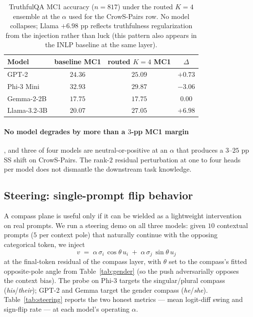 \begin{table}[h]
\centering
\small
\caption{TruthfulQA MC1 accuracy ($n=817$) under the routed $K{=}4$
ensemble at the $\alpha$ used for the CrowS-Pairs row. No model
collapses; Llama $+6.98$ pp reflects truthfulness regularization from
the injection rather than luck (this pattern also appears in the
INLP baseline at the same layer).}
\label{tab:truthfulqa}
\begin{tabular}{lccc}
\toprule
Model & baseline MC1 & routed $K{=}4$ MC1 & $\Delta$ \\
\midrule
GPT-2        & $24.36$ & $25.09$ & $+0.73$ \\
Phi-3 Mini   & $32.93$ & $29.87$ & $-3.06$ \\
Gemma-2-2B   & $17.75$ & $17.75$ & $0.00$  \\
Llama-3.2-3B & $20.07$ & $27.05$ & $+6.98$ \\
\bottomrule
\end{tabular}
\end{table}

\paragraph{No model degrades by more than a $3$-pp MC1 margin}, and
three of four models are neutral-or-positive at an $\alpha$ that
produces a $3$--$25$ pp SS shift on CrowS-Pairs. The rank-$2$ residual
perturbation at one to four heads per model does not dismantle the
downstream task knowledge.

\subsection{Steering: single-prompt flip behavior}
\label{sec:steering}

A compass plane is useful only if it can be wielded as a lightweight
intervention on real prompts. We run a steering demo on all three
models: given $10$ contextual prompts ($5$ per context pole) that
naturally continue with the opposing categorical token, we inject
\[
v \;=\; \alpha\,\sigma_i\,\cos\theta\,u_i \;+\; \alpha\,\sigma_j\,\sin\theta\,u_j
\]
at the final-token residual of the compass layer, with $\theta$ set to
the compass's fitted opposite-pole angle from Table~\ref{tab:gender}
(so the push adversarially opposes the context bias). The probe on
Phi-3 targets the singular/plural compass (\emph{his}/\emph{their});
GPT-2 and Gemma target the gender compass (\emph{he}/\emph{she}).
Table~\ref{tab:steering} reports the two honest metrics --- mean
logit-diff swing and sign-flip rate --- at each model's operating
$\alpha$.

